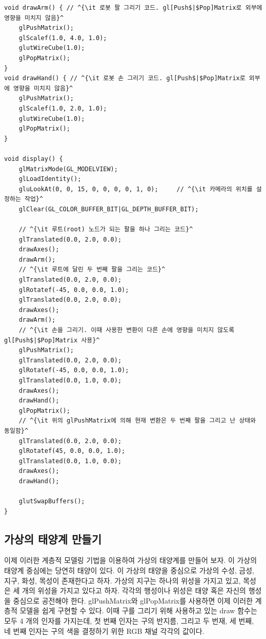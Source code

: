 \begin{algorithmbis}\label{code:OGL_transform:robotArm}
\lstset{language=C++, escapechar=^} 
\begin{lstlisting}
void drawArm() { // ^{\it 로봇 팔 그리기 코드. gl[Push$|$Pop]Matrix로 외부에 영향을 미치지 않음}^
    glPushMatrix();
    glScalef(1.0, 4.0, 1.0);
    glutWireCube(1.0);
    glPopMatrix();
}
void drawHand() { // ^{\it 로봇 손 그리기 코드. gl[Push$|$Pop]Matrix로 외부에 영향을 미치지 않음}^
    glPushMatrix();
    glScalef(1.0, 2.0, 1.0);
    glutWireCube(1.0);
    glPopMatrix();
}

void display() {
    glMatrixMode(GL_MODELVIEW);
    glLoadIdentity();
    gluLookAt(0, 0, 15, 0, 0, 0, 0, 1, 0);     // ^{\it 카메라의 위치를 설정하는 작업}^
    glClear(GL_COLOR_BUFFER_BIT|GL_DEPTH_BUFFER_BIT);
    
    // ^{\it 루트(root) 노드가 되는 팔을 하나 그리는 코드}^
    glTranslated(0.0, 2.0, 0.0);
    drawAxes();
    drawArm();
    // ^{\it 루트에 달린 두 번째 팔을 그리는 코드}^
    glTranslated(0.0, 2.0, 0.0);
    glRotatef(-45, 0.0, 0.0, 1.0);
    glTranslated(0.0, 2.0, 0.0);
    drawAxes();
    drawArm();
    // ^{\it 손을 그리기. 이때 사용한 변환이 다른 손에 영향을 미치지 않도록 gl[Push$|$Pop]Matrix 사용}^
    glPushMatrix();
    glTranslated(0.0, 2.0, 0.0);
    glRotatef(-45, 0.0, 0.0, 1.0);
    glTranslated(0.0, 1.0, 0.0);
    drawAxes();
    drawHand();
    glPopMatrix();
    // ^{\it 위의 glPushMatrix에 의해 현재 변환은 두 번째 팔을 그리고 난 상태와 동일함}^
    glTranslated(0.0, 2.0, 0.0);
    glRotatef(45, 0.0, 0.0, 1.0);
    glTranslated(0.0, 1.0, 0.0);
    drawAxes();
    drawHand();
    
    glutSwapBuffers();
}
\end{lstlisting}
\end{algorithmbis}

\subsection{가상의 태양계 만들기}
이제 이러한 계층적 모델링 기법을 이용하여 가상의 태양계를 만들어 보자. 이 가상의 태양계 중심에는 당연히 태양이 있다. 이 가상의 태양을 중심으로 가상의 수성, 금성, 지구, 화성, 목성이 존재한다고 하자. 가상의 지구는 하나의 위성을 가지고 있고, 목성은 세 개의 위성을 가지고 있다고 하자. 각각의 행성이나 위성은 태양 혹은 자신의 행성을 중심으로 공전해야 한다.  {\sf glPushMatrix}와 {\sf glPopMatrix}를 사용하면 이제 이러한 계층적 모델을 쉽게 구현할 수 있다. 이때 구를 그리기 위해 사용하고 있는 {\sf draw} 함수는
모두 4 개의 인자를 가지는데, 첫 번째 인자는 구의 반지름, 그리고 두 번재, 세 번째, 네 번째 인자는 구의 색을 결정하기 위한 RGB 채널 각각의 값이다.

